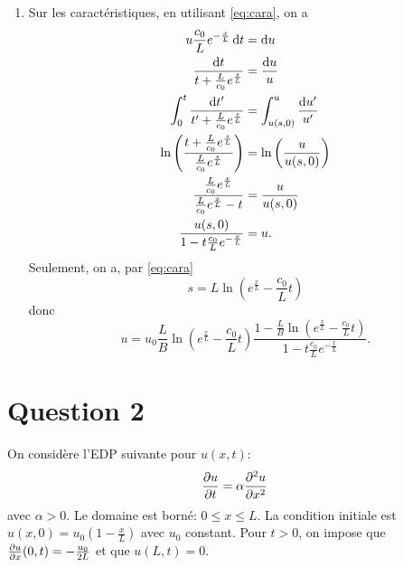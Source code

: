 {\begin{enumerate}
\begin{figure}
        \caption{Caractéristiques et $\Gamma\equiv t = 0$.}
        \label{fig:cara}
      \end{figure}
    \item Sur les caractéristiques, en utilisant \eqref{eq:cara}, on a
    \begin{align*}
      u\frac{c_0}{L}e^{-\frac{x}{L}}\operatorname{d}\! t & = \operatorname{d}\! u\\
      \frac{\operatorname{d}\! t}{t+\frac{L}{c_0}e^{\frac{s}{L}}} & = \frac{\operatorname{d}\! u}{u}\\
      \int_0^t \frac{\operatorname{d}\! t'}{t'+\frac{L}{c_0}e^{\frac{s}{L}}}
      & = \int_{u(s,0)}^{u}\frac{\operatorname{d}\! u'}{u'}\\
      \ln\left(
      \frac{t+\frac{L}{c_0}e^{\frac{s}{L}}}{\frac{L}{c_0}e^{\frac{s}{L}}}
      \right)
      & = \ln\left(\frac{u}{u(s,0)}\right)\\
      \frac{\frac{L}{c_0}e^{\frac{x}{L}}}{\frac{L}{c_0}e^{\frac{x}{L}}-t}
      & = \frac{u}{u(s,0)}\\
      \frac{u(s,0)}{1-t\frac{c_0}{L}e^{-\frac{x}{L}}}
      & = u.
    \end{align*}
    Seulement, on a, par \eqref{eq:cara}
    \[ s = L\ln\left(e^{\frac{x}{L}}-\frac{c_0}{L}t\right) \]
    donc
    \[ u = u_0 \frac{L}{B}\ln\left(e^{\frac{x}{L}}-\frac{c_0}{L}t\right)
      \frac{1-\frac{L}{B}\ln\left(e^{\frac{x}{L}}-\frac{c_0}{L}t\right)}
    {1-t\frac{c_0}{L}e^{-\frac{x}{L}}}. \]
\end{enumerate}}

\section*{Question 2}
On considère l'EDP suivante pour $u(x,t)$:
\[ \frac{\partial u}{\partial t} = \alpha\frac{\partial^2 u}{\partial x^2} \]
avec $\alpha>0$. Le domaine est borné: $0\leq x \leq L$.
La condition initiale est
$u(x,0) = u_0\left(1 - \frac{x}{L}\right)$ avec $u_0$ constant.
Pour $t > 0$, on impose que $\frac{\partial u}{\partial x}(0,t) = -\frac{u_0}{2L}$ et
que $u(L,t) = 0$.

